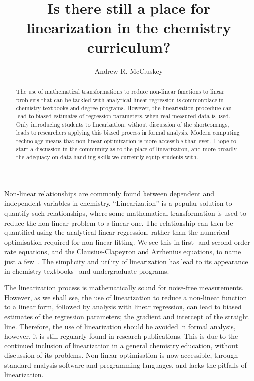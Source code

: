 \documentclass[journal=jacsat,manuscript=article]{achemso}
\author{Andrew R. McCluskey}
\affiliation{European Spallation Source ERIC, Ole Maaløes vej 3, 2200 København N, DK}
\title{Is there still a place for linearization in the chemistry curriculum?}
\begin{document}
\begin{abstract}
    The use of mathematical transformations to reduce non-linear functions to linear problems that can be tackled with analytical linear regression is commonplace in chemistry textbooks and degree programs. 
    However, the linearisation procedure can lead to biased estimates of regression parameters, when real measured data is used. 
    Only introducing students to linearization, without discussion of the shortcomings, leads to researchers applying this biased process in formal analysis.
    Modern computing technology means that non-linear optimization is more accessible than ever. 
    I hope to start a discussion in the community as to the place of linearization, and more broadly the adequacy on data handling skills we currently equip students with.
\end{abstract}

\maketitle 

Non-linear relationships are commonly found between dependent and independent variables in chemistry. 
``Linearization'' is a popular solution to quantify such relationships, where some mathematical transformation is used to reduce the non-linear problem to a linear one. 
The relationship can then be quantified using the analytical linear regression, rather than the numerical optimisation required for non-linear fitting. 
We see this in first- and second-order rate equations, and the Clausius-Clapeyron and Arrhenius equations, to name just a few~\cite{perrin_linear_2017,harper_data_2017,monk_math_2010}.
The simplicity and utility of linearization has lead to its appearance in chemistry textbooks~\cite{monk_math_2010,atkins_physical_2018} and undergraduate programs. 

The linearization process is mathematically sound for noise-free measurements. 
However, as we shall see, the use of linearization to reduce a non-linear function to a linear form, followed by analysis with linear regression, can lead to biased estimates of the regression parameters; the gradient and intercept of the straight line. 
Therefore, the use of linearization should be avoided in formal analysis, however, it is still regularly found in research publications. 
This is due to the continued inclusion of linearization in a general chemistry education, without discussion of its problems. 
Non-linear optimisation is now accessible, through standard analysis software and programming languages, and lacks the pitfalls of linearization. 
\end{document}
